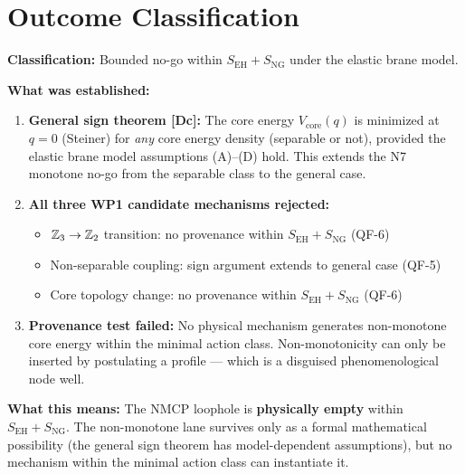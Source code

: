 \section{Outcome Classification}
\label{sec:NMCP:outcome}

\begin{resultbox}[title=NMCP WP2 Outcome: Bounded No-Go]
\textbf{Classification:} Bounded no-go within
$S_{\mathrm{EH}} + S_{\mathrm{NG}}$ under the elastic brane model.

\textbf{What was established:}
\begin{enumerate}
    \item \textbf{General sign theorem [Dc]:} The core energy
          $V_{\mathrm{core}}(q)$ is minimized at $q = 0$ (Steiner)
          for \emph{any} core energy density (separable or not),
          provided the elastic brane model assumptions (A)--(D) hold.
          This extends the N7 monotone no-go from the separable class
          to the general case.

    \item \textbf{All three WP1 candidate mechanisms rejected:}
          \begin{itemize}
              \item $\mathbb{Z}_3 \to \mathbb{Z}_2$ transition: no provenance
                    within $S_{\mathrm{EH}} + S_{\mathrm{NG}}$ (QF-6)
              \item Non-separable coupling: sign argument extends to
                    general case (QF-5)
              \item Core topology change: no provenance within
                    $S_{\mathrm{EH}} + S_{\mathrm{NG}}$ (QF-6)
          \end{itemize}

    \item \textbf{Provenance test failed:} No physical mechanism
          generates non-monotone core energy within the minimal action
          class. Non-monotonicity can only be inserted by postulating
          a profile --- which is a disguised phenomenological node well.
\end{enumerate}

\textbf{What this means:}
The NMCP loophole is \textbf{physically empty} within
$S_{\mathrm{EH}} + S_{\mathrm{NG}}$. The non-monotone lane survives
only as a formal mathematical possibility (the general sign theorem
has model-dependent assumptions), but no mechanism within the minimal
action class can instantiate it.


\end{resultbox}
